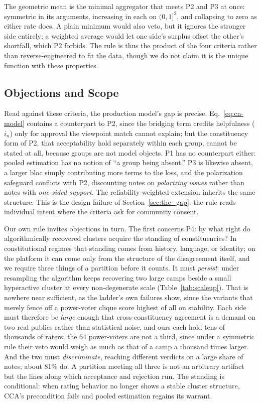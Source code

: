 \documentclass[10pt,twocolumn]{article}
\begin{document}
The geometric mean is the minimal aggregator that meets P2 and P3 at once:
symmetric in its arguments, increasing in each on $(0,1]^2$, and collapsing to
zero as either rate does. A plain minimum would also veto, but it ignores the
stronger side entirely; a weighted average would let one side's surplus offset
the other's shortfall, which P2 forbids. The rule is thus the product of the
four criteria rather than reverse-engineered to fit the data, though we do not
claim it is the unique function with these properties.

\subsection*{Objections and Scope}

Read against these criteria, the production model's gap is precise.
Eq.~\eqref{eq:cn-model} contains a counterpart to P2, since the bridging term
credits helpfulness ($i_n$) only for approval the viewpoint match cannot
explain; but the constituency form of P2, that acceptability hold separately
within each group, cannot be stated at all, because groups are not model
objects. P1 has no counterpart either: pooled estimation has no notion of ``a
group being absent.'' P3 is likewise absent, a larger bloc simply contributing
more terms to the loss, and the polarization safeguard conflicts with P2,
discounting notes on \emph{polarizing issues} rather than notes with
\emph{one-sided support}. The reliability-weighted extension
\citep{goyal2026qsmf} inherits the same structure. This is the design failure of
Section~\ref{sec:the_gap}: the rule reads individual intent where the criteria
ask for community consent.

Our own rule invites objections in turn. The first concerns P4: by what right
do algorithmically recovered clusters acquire the standing of constituencies?
In constitutional regimes that standing comes from history, language, or
identity; on the platform it can come only from the structure of the
disagreement itself, and we require three things of a partition before it
counts. It must \emph{persist}: under resampling the algorithm keeps recovering
two large camps beside a small hyperactive cluster at every non-degenerate
scale (Table~\ref{tab:scaleup}). That is nowhere near sufficient, as the
ladder's own failures show, since the variants that merely fence off a
power-voter clique score highest of all on stability. Each side must therefore
be \emph{large} enough that cross-constituency agreement is a demand on two real
publics rather than statistical noise, and ours each hold tens of thousands of
raters; the 64 power-voters are not a third, since under a symmetric rule their
veto would weigh as much as that of a camp a thousand times larger. And the two
must \emph{discriminate}, reaching different verdicts on a large share of notes;
about 81\% do. A partition meeting all three is not an arbitrary artifact but
the lines along which acceptance and rejection run. The standing is conditional:
when rating behavior no longer shows a stable cluster structure, CCA's
precondition fails and pooled estimation regains its warrant.
\end{document}
